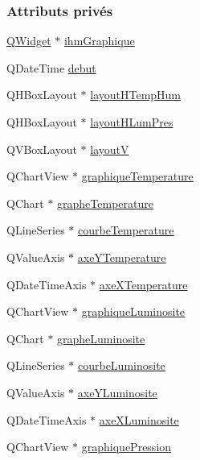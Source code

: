 \subsubsection*{Attributs privés}
\begin{DoxyCompactItemize}
\item 
\hyperlink{class_q_widget}{Q\+Widget} $\ast$ \hyperlink{class_graphique_a55d98b20085f7c79f42f3ae0423ac72a}{ihm\+Graphique}
\item 
Q\+Date\+Time \hyperlink{class_graphique_a468d57ae7b14b46558cf25629cced7b6}{debut}
\item 
Q\+H\+Box\+Layout $\ast$ \hyperlink{class_graphique_a1ccd9268372eef81a117bd82b50bec6a}{layout\+H\+Temp\+Hum}
\item 
Q\+H\+Box\+Layout $\ast$ \hyperlink{class_graphique_a622c90a88a11b29aa275906a3ee051ef}{layout\+H\+Lum\+Pres}
\item 
Q\+V\+Box\+Layout $\ast$ \hyperlink{class_graphique_a2a8dbb06be361da2b8a500f231c1c607}{layoutV}
\item 
Q\+Chart\+View $\ast$ \hyperlink{class_graphique_a485cc4a65014e812b9e4aa9ee3ea9ca4}{graphique\+Temperature}
\item 
Q\+Chart $\ast$ \hyperlink{class_graphique_ad2fe81a972ee10a20a56300a87a78f24}{graphe\+Temperature}
\item 
Q\+Line\+Series $\ast$ \hyperlink{class_graphique_a6c2f8ef3364123ad300de74db529bd9b}{courbe\+Temperature}
\item 
Q\+Value\+Axis $\ast$ \hyperlink{class_graphique_a3df7eeca8d7dba5f528f65d89883736f}{axe\+Y\+Temperature}
\item 
Q\+Date\+Time\+Axis $\ast$ \hyperlink{class_graphique_a83ef0cdf381f66a6202022b8545bfb1c}{axe\+X\+Temperature}
\item 
Q\+Chart\+View $\ast$ \hyperlink{class_graphique_a55f7c2a564ee7ea232a9328ebad29f40}{graphique\+Luminosite}
\item 
Q\+Chart $\ast$ \hyperlink{class_graphique_adbed6be47df503c9a260586b0d93f5c4}{graphe\+Luminosite}
\item 
Q\+Line\+Series $\ast$ \hyperlink{class_graphique_a8bf527363f5d8198bf6fc959a8689963}{courbe\+Luminosite}
\item 
Q\+Value\+Axis $\ast$ \hyperlink{class_graphique_a275865e638fd7cb5183d29d8b1a3624e}{axe\+Y\+Luminosite}
\item 
Q\+Date\+Time\+Axis $\ast$ \hyperlink{class_graphique_ae4daff72419cbb9e49209f931e79a83b}{axe\+X\+Luminosite}
\item 
Q\+Chart\+View $\ast$ \hyperlink{class_graphique_aa389bad562aa7ccba12aa490e02c672b}{graphique\+Pression}

\end{DoxyCompactItemize}
